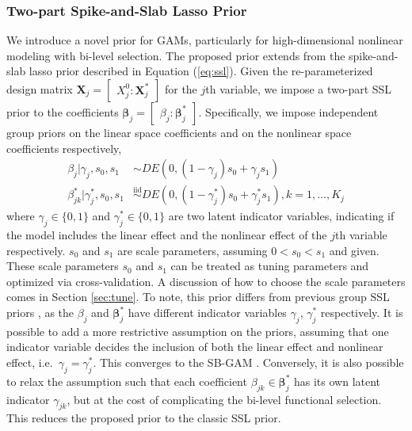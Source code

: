 \documentclass[AMA,STIX1COL,]{WileyNJD-v2}
\begin{document}
\subsubsection{Two-part Spike-and-Slab Lasso Prior}

We introduce a novel prior for GAMs, particularly for high-dimensional
nonlinear modeling with bi-level selection. The proposed prior extends
from the spike-and-slab lasso prior described in Equation
(\ref{eq:ssl}). Given the re-parameterized design matrix
\(\boldsymbol{X}_j = \begin{bmatrix} X^0_j : \boldsymbol{X}_j^*\end{bmatrix}\)
for the \(j\)th variable, we impose a two-part SSL prior to the
coefficients
\(\boldsymbol{\beta}_j = \begin{bmatrix} \beta_j : \boldsymbol{\beta}_j^*\end{bmatrix}\).
Specifically, we impose independent group priors on the linear space
coefficients and on the nonlinear space coefficients respectively,
\begin{align}\label{eq:bham_ssl}
  \beta_{j} |\gamma_{j},s_0,s_1 &\sim DE(0,(1-\gamma_{j}) s_0 + \gamma_{j} s_1) \nonumber \\
  \beta^*_{jk} | \gamma^*_{j},s_0,s_1 &\overset{\text{iid}}{\sim}DE(0,(1-\gamma^*_{j}) s_0 + \gamma^*_{j} s_1), k=1,\dots, K_j
\end{align} where \(\gamma_{j}\in\{0,1\}\) and
\(\gamma^*_{j}\in \{0,1\}\) are two latent indicator variables,
indicating if the model includes the linear effect and the nonlinear
effect of the \(j\)th variable respectively. \(s_0\) and \(s_1\) are
scale parameters, assuming \(0 < s_0 < s_1\) and given. These scale
parameters \(s_0\) and \(s_1\) can be treated as tuning parameters and
optimized via cross-validation. A discussion of how to choose the scale
parameters comes in Section \ref{sec:tune}. To note, this prior differs
from previous group SSL priors \citep{Tang2018, Tang2019}, as the
\(\beta_j\) and \(\boldsymbol{\beta}^*_j\) have different indicator
variables \(\gamma_j\), \(\gamma_j^*\) respectively. It is possible to
add a more restrictive assumption on the priors, assuming that one
indicator variable decides the inclusion of both the linear effect and
nonlinear effect, i.e.~\(\gamma_j = \gamma^*_j\). This converges to the
SB-GAM \citep{Bai2021}. Conversely, it is also possible to relax the
assumption such that each coefficient
\(\beta_{jk} \in \boldsymbol{\beta}^*_j\) has its own latent indicator
\(\gamma_{jk}\), but at the cost of complicating the bi-level functional
selection. This reduces the proposed prior to the classic SSL prior.
\end{document}
